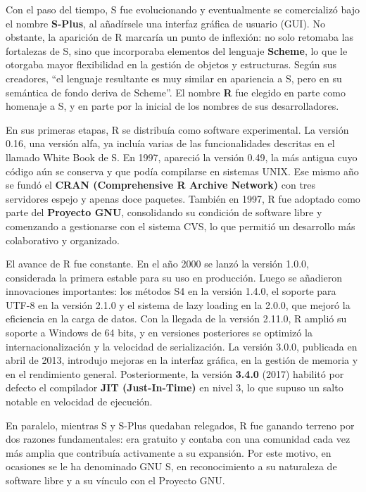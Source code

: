 \documentclass[
  letterpaper,
  DIV=11,
  numbers=noendperiod]{scrreprt}
\begin{document}
Con el paso del tiempo, S fue evolucionando y eventualmente se
comercializó bajo el nombre \textbf{S-Plus}, al añadírsele una interfaz
gráfica de usuario (GUI). No obstante, la aparición de R marcaría un
punto de inflexión: no solo retomaba las fortalezas de S, sino que
incorporaba elementos del lenguaje \textbf{Scheme}, lo que le otorgaba
mayor flexibilidad en la gestión de objetos y estructuras. Según sus
creadores, ``el lenguaje resultante es muy similar en apariencia a S,
pero en su semántica de fondo deriva de Scheme''. El nombre \textbf{R}
fue elegido en parte como homenaje a S, y en parte por la inicial de los
nombres de sus desarrolladores.

En sus primeras etapas, R se distribuía como software experimental. La
versión 0.16, una versión alfa, ya incluía varias de las funcionalidades
descritas en el llamado White Book de S. En 1997, apareció la versión
0.49, la más antigua cuyo código aún se conserva y que podía compilarse
en sistemas UNIX. Ese mismo año se fundó el \textbf{CRAN (Comprehensive
R Archive Network)} con tres servidores espejo y apenas doce paquetes.
También en 1997, R fue adoptado como parte del \textbf{Proyecto GNU},
consolidando su condición de software libre y comenzando a gestionarse
con el sistema CVS, lo que permitió un desarrollo más colaborativo y
organizado.

El avance de R fue constante. En el año 2000 se lanzó la versión 1.0.0,
considerada la primera estable para su uso en producción. Luego se
añadieron innovaciones importantes: los métodos S4 en la versión 1.4.0,
el soporte para UTF-8 en la versión 2.1.0 y el sistema de lazy loading
en la 2.0.0, que mejoró la eficiencia en la carga de datos. Con la
llegada de la versión 2.11.0, R amplió su soporte a Windows de 64 bits,
y en versiones posteriores se optimizó la internacionalización y la
velocidad de serialización. La versión 3.0.0, publicada en abril de
2013, introdujo mejoras en la interfaz gráfica, en la gestión de memoria
y en el rendimiento general. Posteriormente, la versión \textbf{3.4.0}
(2017) habilitó por defecto el compilador \textbf{JIT (Just-In-Time)} en
nivel 3, lo que supuso un salto notable en velocidad de ejecución.

En paralelo, mientras S y S-Plus quedaban relegados, R fue ganando
terreno por dos razones fundamentales: era gratuito y contaba con una
comunidad cada vez más amplia que contribuía activamente a su expansión.
Por este motivo, en ocasiones se le ha denominado GNU S, en
reconocimiento a su naturaleza de software libre y a su vínculo con el
Proyecto GNU.
\end{document}
